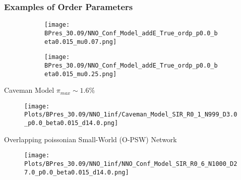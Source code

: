 \documentclass{beamer}
\begin{document}
\begin{frame}
	\frametitle{Examples of Order Parameters}

	\begin{figure}[t]
		\begin{subfigure}[t]{0.6\linewidth}
			\vspace{-.5cm}
			\centering
			\texttt{[image: BPres\_30.09/NNO\_Conf\_Model\_addE\_True\_ordp\_p0.0\_beta0.015\_mu0.07.png]} 
			\label{fig:Ordp_OPSW_COVID19_D14}
		\end{subfigure}
		\begin{subfigure}[t]{0.6\linewidth}
			\vspace{-0.5cm}
			\centering
			\texttt{[image: BPres\_30.09/NNO\_Conf\_Model\_addE\_True\_ordp\_p0.0\_beta0.015\_mu0.25.png]}
			\label{fig:Ordp_OPSW_highmu_COVID19}
		\end{subfigure}
		\label{fig:Ordp_OPSW_COVID19_panel}
	\end{figure}

\end{frame}

\begin{frame}{Caveman Model $\pi_{max} \sim 1.6 \%$  }
	\begin{figure}
		\texttt{[image: Plots/BPres\_30.09/NNO\_1inf/Caveman\_Model\_SIR\_R0\_1\_N999\_D3.0\_p0.0\_beta0.015\_d14.0.png]} %
	\end{figure}
\end{frame}

\begin{frame}{Overlapping poissonian Small-World (O-PSW) Network}
	\begin{figure}
			\texttt{[image: Plots/BPres\_30.09/NNO\_1inf/NNO\_Conf\_Model\_SIR\_R0\_6\_N1000\_D27.0\_p0.0\_beta0.015\_d14.0.png]}
	\end{figure}
\end{frame}
\end{document}
